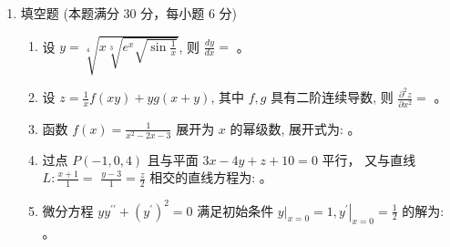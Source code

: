 
\begin{enumerate}
	\item
	填空题 (本题满分 30 分，每小题 6 分)
	\begin{enumerate}
		\item
		设 $y=\sqrt[4]{x \sqrt[3]{e^{x} \sqrt{\sin \frac{1}{x}}}}$, 则 $\frac{d y}{d x}=$   。
		\item  
设 $z=\frac{1}{x} f(x y)+y g(x+y)$, 其中 $f, g$ 具有二阶连续导数, 则 $\frac{\partial^{2} z}{\partial x^{2}}=$    。
		
		
		\item
		函数 $f(x)=\frac{1}{x^{2}-2 x-3}$ 展开为 $x$ 的幂级数, 展开式为:  。



\item
过点 $P(-1,0,4)$ 且与平面 $3 x-4 y+z+10=0$ 平行， 又与直线 $L: \frac{x+1}{1}=$ $\frac{y-3}{1}=\frac{z}{2}$ 相交的直线方程为:    。

\item
微分方程 $y y^{\prime\prime}+\left(y^{\prime}\right)^{2}=0$ 满足初始条件 $\left.y\right|_{x=0}=1,\left.y^{\prime}\right|_{x=0}=\frac{1}{2}$ 的解为:  
 。
		
	
		

\end{enumerate}
\end{enumerate}
